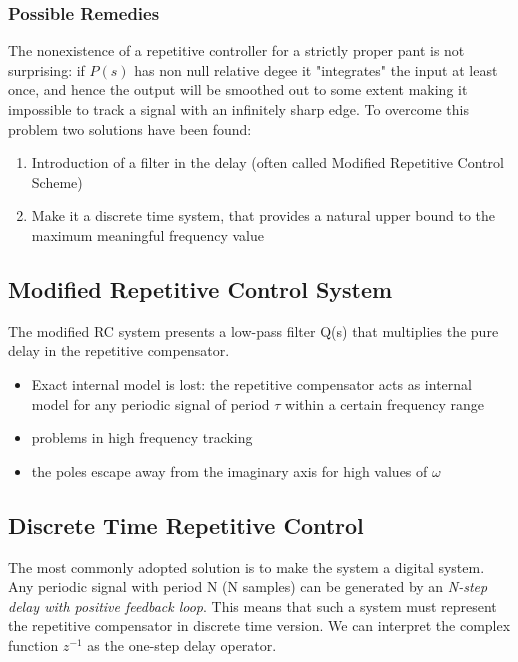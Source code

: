 \documentclass{book}
\begin{document}
\subsubsection{Possible Remedies}
The nonexistence of a repetitive controller for a strictly proper pant is not surprising: if $P(s)$ has non null relative degee it "integrates" the input at least once, and hence the output will be smoothed out to some extent making it impossible to track a signal with an infinitely sharp edge. To overcome this problem two solutions have been found:
\begin{enumerate}
    \item Introduction of a filter in the delay (often called Modified Repetitive Control Scheme)
    \item Make it a discrete time system, that provides a natural upper bound to the maximum meaningful frequency value 
\end{enumerate}
\subsection{Modified Repetitive Control System}
The modified RC system presents a low-pass filter Q(s) that multiplies the pure delay in the repetitive compensator. 
\begin{itemize}
    \item Exact internal model is lost: the repetitive compensator acts as internal model for any periodic signal of period $\tau$ within a certain frequency range 
    \item problems in high frequency tracking 
    \item the poles escape away from the imaginary axis for high values of $\omega$ 
\end{itemize}

\subsection{Discrete Time Repetitive Control}
The most commonly adopted solution is to make the system a digital system. Any periodic signal with period N (N samples) can be generated by an \emph{N-step delay with positive feedback loop}. This means that such a system must represent the repetitive compensator in discrete time version. We can interpret the complex function $z^{-1}$ as the one-step delay operator. 
\end{document}
